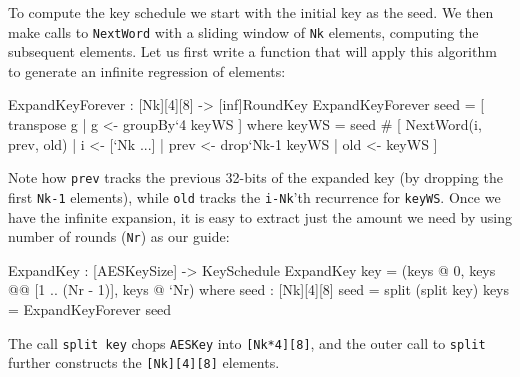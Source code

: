 To compute the key schedule we start with the initial key as the
seed. We then make calls to {\tt NextWord} with a sliding window of
{\tt Nk} elements, computing the subsequent elements. Let us first
write a function that will apply this algorithm to generate an
infinite regression of elements:\indDrop\indTranspose
\begin{code}
  ExpandKeyForever : [Nk][4][8] -> [inf]RoundKey
  ExpandKeyForever seed = [ transpose g | g <- groupBy`{4} keyWS ]
    where keyWS = seed # [ NextWord(i, prev, old)
                          | i    <- [`Nk ...]
                          | prev <- drop`{Nk-1} keyWS
                          | old  <- keyWS
                         ]
\end{code}
Note how {\tt prev} tracks the previous 32-bits of the expanded key
(by dropping the first {\tt Nk-1} elements), while {\tt old} tracks
the {\tt i-Nk}'th recurrence for {\tt keyWS}. Once we have the
infinite expansion, it is easy to extract just the amount we need by
using number of rounds ({\tt Nr}) as our guide:\indIndex\indIndexs
\begin{code}
  ExpandKey : [AESKeySize] -> KeySchedule
  ExpandKey key = (keys @ 0, keys @@ [1 .. (Nr - 1)], keys @ `Nr)
    where  seed : [Nk][4][8]
           seed = split (split key)
           keys = ExpandKeyForever seed
\end{code}
The call {\tt split key} chops {\tt AESKey} into {\tt [Nk*4][8]}, and
the outer call to {\tt split} further constructs the {\tt [Nk][4][8]}
elements.

